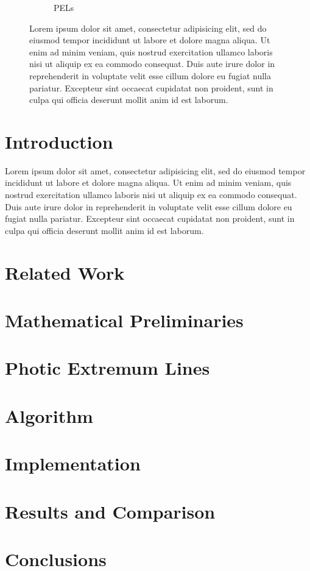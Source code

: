 \documentclass[9pt,fleqn,twoside,twocolumn]{stdglobal}
\begin{document}
\begin{figure}
\begin{subfigure}[b]{0.24\textwidth}
      \caption{PELs}
    \end{subfigure}%
    \caption{Lorem ipsum dolor sit amet, consectetur adipisicing elit, sed do eiusmod
    tempor incididunt ut labore et dolore magna aliqua. Ut enim ad minim veniam,
    quis nostrud exercitation ullamco laboris nisi ut aliquip ex ea commodo
    consequat. Duis aute irure dolor in reprehenderit in voluptate velit esse
    cillum dolore eu fugiat nulla pariatur. Excepteur sint occaecat cupidatat non
    proident, sunt in culpa qui officia deserunt mollit anim id est laborum.}
  \end{figure}

\section{Introduction}
  Lorem ipsum dolor sit amet, consectetur adipisicing elit, sed do eiusmod
  tempor incididunt ut labore et dolore magna aliqua. Ut enim ad minim veniam,
  quis nostrud exercitation ullamco laboris nisi ut aliquip ex ea commodo
  consequat. Duis aute irure dolor in reprehenderit in voluptate velit esse
  cillum dolore eu fugiat nulla pariatur. Excepteur sint occaecat cupidatat non
  proident, sunt in culpa qui officia deserunt mollit anim id est laborum.

\section{Related Work}

\section{Mathematical Preliminaries}

\section{Photic Extremum Lines}

\section{Algorithm}

\section{Implementation}

\section{Results and Comparison}

\section{Conclusions}

\nocite{*}
\printbibliography[heading=bibintoc]

\appendix
\end{document}
